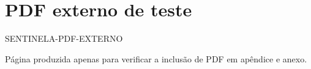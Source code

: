 \documentclass[perfil=artigo]{undftex}
\begin{document}
\pagestyle{empty}
\section*{PDF externo de teste}
SENTINELA-PDF-EXTERNO

Página produzida apenas para verificar a inclusão de PDF em apêndice e anexo.
\end{document}
